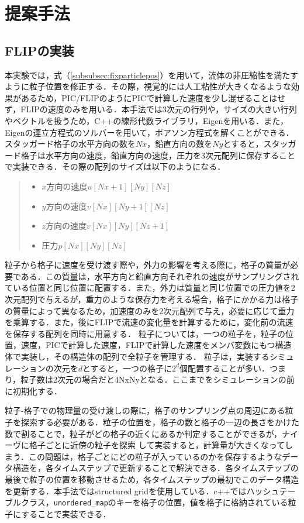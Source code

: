 \documentclass[a4j,12pt]{jreport}
\begin{document}
\chapter{提案手法} \label{chapter:4}
\section{FLIPの実装} \label{sec:ImpFLIP}
本実験では，式（\ref{subsubsec:fixparticlepos}）を用いて，流体の非圧縮性を満たすように粒子位置を修正する．その際，視覚的には人工粘性が大きくなるような効果があるため，PIC/FLIPのようにPICで計算した速度を少し混ぜることはせず，FLIPの速度のみを用いる．本手法では3次元の行列や，サイズの大きい行列やベクトルを扱うため，C++の線形代数ライブラリ，Eigenを用いる．また，Eigenの連立方程式のソルバーを用いて，ポアソン方程式を解くことができる．
スタッガード格子の水平方向の数を$Nx$，鉛直方向の数を$Ny$とすると，スタッガード格子は水平方向の速度，鉛直方向の速度，圧力を3次元配列に保存することで実装できる．その際の配列のサイズは以下のようになる．
\begin{quote}
	\begin{itemize}
		\item $x方向の速度 u[Nx+1][Ny][Nz]$ 
		\item $y方向の速度 v[Nx][Ny+1][Nz]$ 
		\item $z方向の速度 v[Nx][Ny][Nz+1]$ 
		\item $圧力 p[Nx][Ny][Nz]$
	\end{itemize}
\end{quote}
粒子から格子に速度を受け渡す際や，外力の影響を考える際に，格子の質量が必要である．この質量は，水平方向と鉛直方向それぞれの速度がサンプリングされている位置と同じ位置に配置する．また，外力は質量と同じ位置での圧力値を2次元配列で与えるが，重力のような保存力を考える場合，格子にかかる力は格子の質量によって異なるため，加速度のみを2次元配列で与え，必要に応じて重力を乗算する．また，後にFLIPで流速の変化量を計算するために，変化前の流速を保存する配列を同時に用意する．
粒子については，一つの粒子を，粒子の位置，速度，PICで計算した速度，FLIPで計算した速度をメンバ変数にもつ構造体で実装し，その構造体の配列で全粒子を管理する．
粒子は，実装するシミュレーションの次元を$d$とすると，一つの格子に$2^d$個配置することが多い．つまり，粒子数は2次元の場合だと4NxNyとなる．ここまでをシミュレーションの前に初期化する．

粒子-格子での物理量の受け渡しの際に，格子のサンプリング点の周辺にある粒子を探索する必要がある．粒子の位置を，格子の数と格子の一辺の長さをかけた数で割ることで，粒子がどの格子の近くにあるか判定することができるが，ナイーヴに格子ごとに近傍の粒子を探索
して実装すると，計算量が大きくなってしまう．この問題は，格子ごとにどの粒子が入っているのかを保存するようなデータ構造を，各タイムステップで更新することで解決できる．各タイムステップの最後で粒子の位置を移動させるため，各タイムステップの最初でこのデータ構造を更新する．本手法ではstructured gridを使用している．c++ではハッシュテーブルクラス，\texttt{unordered\_map}のキーを格子の位置，値を格子に格納されている粒子にすることで実装できる．
\end{document}
